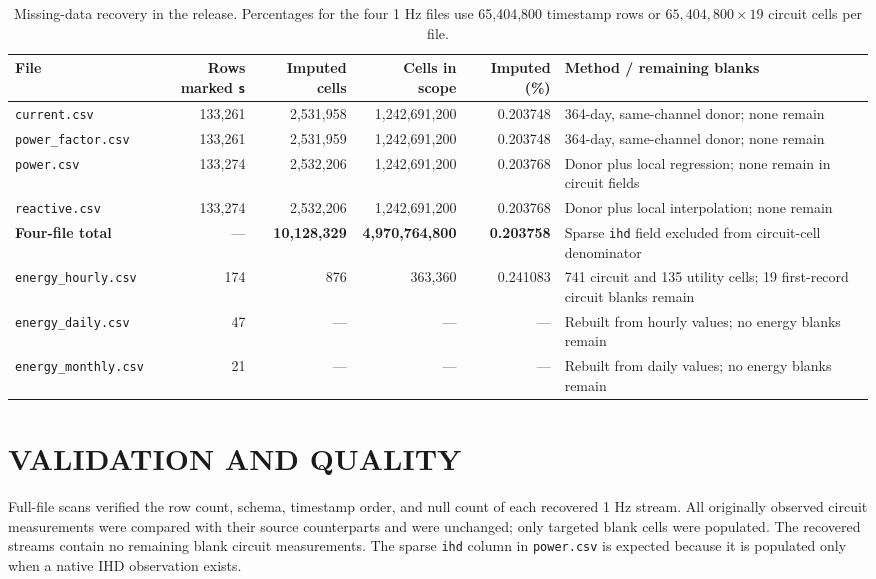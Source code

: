 \documentclass{IEEEoj-data}
\begin{document}
\begin{table}[t]
\centering
\caption{Missing-data recovery in the release. Percentages for the four 1 Hz files use 65,404,800 timestamp rows or $65{,}404{,}800\times19$ circuit cells per file.}
\label{tab:imputation}
\scriptsize
\begin{tabularx}{\textwidth}{lrrrrY}
\toprule
File & Rows marked \texttt{s} & Imputed cells & Cells in scope & Imputed (\%) & Method / remaining blanks \\
\midrule
\texttt{current.csv} & 133,261 & 2,531,958 & 1,242,691,200 & 0.203748 & 364-day, same-channel donor; none remain \\
\texttt{power\_factor.csv} & 133,261 & 2,531,959 & 1,242,691,200 & 0.203748 & 364-day, same-channel donor; none remain \\
\texttt{power.csv} & 133,274 & 2,532,206 & 1,242,691,200 & 0.203768 & Donor plus local regression; none remain in circuit fields \\
\texttt{reactive.csv} & 133,274 & 2,532,206 & 1,242,691,200 & 0.203768 & Donor plus local interpolation; none remain \\
\textbf{Four-file total} & --- & \textbf{10,128,329} & \textbf{4,970,764,800} & \textbf{0.203758} & Sparse \texttt{ihd} field excluded from circuit-cell denominator \\
\midrule
\texttt{energy\_hourly.csv} & 174 & 876 & 363,360 & 0.241083 & 741 circuit and 135 utility cells; 19 first-record circuit blanks remain \\
\texttt{energy\_daily.csv} & 47 & --- & --- & --- & Rebuilt from hourly values; no energy blanks remain \\
\texttt{energy\_monthly.csv} & 21 & --- & --- & --- & Rebuilt from daily values; no energy blanks remain \\
\bottomrule
\end{tabularx}
\end{table}

\section*{VALIDATION AND QUALITY}
Full-file scans verified the row count, schema, timestamp order, and null count of each recovered 1 Hz stream. All originally observed circuit measurements were compared with their source counterparts and were unchanged; only targeted blank cells were populated. The recovered streams contain no remaining blank circuit measurements. The sparse \texttt{ihd} column in \texttt{power.csv} is expected because it is populated only when a native IHD observation exists.
\end{document}
